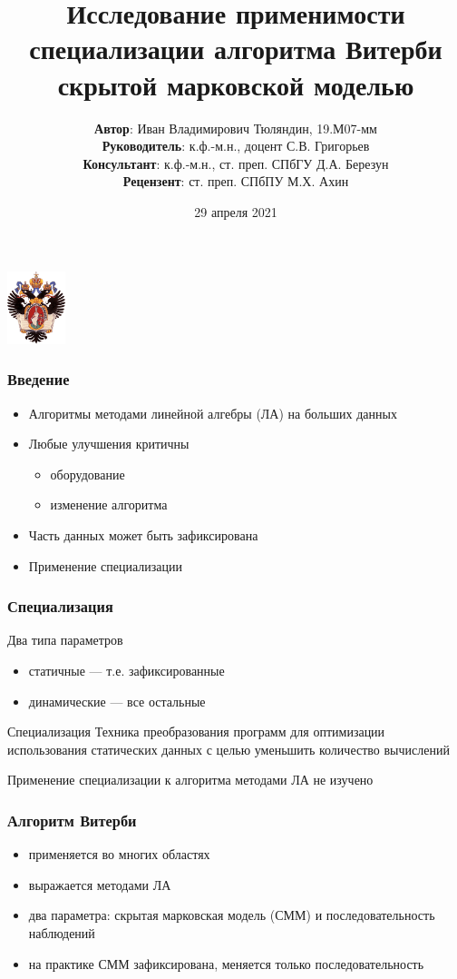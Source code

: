 \documentclass{beamer}
\title[Специализация алгоритма Витерби]{Исследование применимости специализации алгоритма Витерби скрытой марковской моделью}
\institute[СПбГУ]{
Санкт-Петербургский Государственный Университет\\
Кафедра системного программирования}
\author[Иван Тюляндин]{
\textbf{Автор}: Иван Владимирович Тюляндин, 19.М07-мм
\\
\textbf{Руководитель}: к.ф.-м.н., доцент С.В. Григорьев
\\
\textbf{Консультант}: к.ф.-м.н., ст. преп. СПбГУ Д.А. Березун
\\
\textbf{Рецензент}: ст. преп. СПбПУ М.Х. Ахин}
\date{29 апреля 2021}
\begin{document}
{
\begin{frame}
\begin{center}
  \includegraphics[width=1.7cm]{SPbGU_Logo.png}
\vspace{-3pt}
\hspace{-10pt}
\titlepage
\end{center}

\end{frame}
}


\begin{frame}[fragile]
	\frametitle{Введение}
	\begin{itemize}
		\item Алгоритмы методами линейной алгебры (ЛА) на больших данных
		\vfill
		\item Любые улучшения критичны
			\begin{itemize}
				\vfill
				\item оборудование
				\vfill
				\item изменение алгоритма
			\end{itemize}
		\vfill	
		\item Часть данных может быть зафиксирована
		\vfill	
		\item Применение специализации
	\end{itemize}
\end{frame}


\begin{frame}[fragile]
	\frametitle{Специализация}
	Два типа параметров
	\begin{itemize}
		\item статичные --- т.е. зафиксированные
		\item динамические --- все остальные
	\end{itemize}
	\vfill
	\begin{block}{Специализация}
		Техника преобразования программ для оптимизации использования статических данных с целью уменьшить количество вычислений
	\end{block}
	\vfill
	Применение специализации к алгоритма методами ЛА не изучено
\end{frame}

\begin{frame}[fragile]
	\frametitle{Алгоритм Витерби}
	\begin{itemize}
		\item применяется во многих областях
		\vfill
		\item выражается методами ЛА
		\vfill
		\item два параметра: скрытая марковская модель (СММ) и последовательность наблюдений
		\vfill
		\item на практике СММ зафиксирована, меняется только последовательность
	\end{itemize}
\end{frame}
\end{document}
